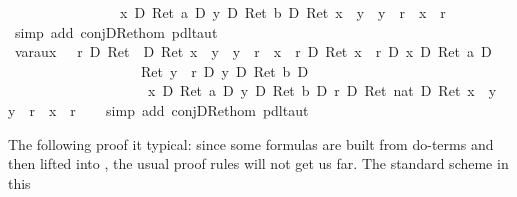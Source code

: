 \begin{isabellebody}
\ \ \ \ \ \ \ \ \ \ \ \ \ \ \ {\isacharparenleft}\ {\isacharasterisk}x\ {\isacharequal}\isactrlsub D\ Ret\ a\ {\isasymand}\isactrlsub D\ {\isacharasterisk}y\ {\isacharequal}\isactrlsub D\ Ret\ b\ {\isasymand}\isactrlsub D\ Ret\ {\isacharparenleft}x\ {\isasymnoteq}\ y\ {\isasymand}\ y\ {\isasymnoteq}\ r\ {\isasymand}\ x\ {\isasymnoteq}\ r{\isacharparenright}\ {\isacharparenright}{\isachardoublequote}\isanewline
\ \ \isamarkupfalse%
\ {\isacharparenleft}simp\ add{\isacharcolon}\ conjD{\isacharunderscore}Ret{\isacharunderscore}hom\ pdl{\isacharunderscore}taut{\isacharparenright}\isanewline
\isanewline
\isanewline
\isamarkupfalse%
\ var{\isacharunderscore}aux{}{\isacharcolon}\ {\isachardoublequote}{\isasymturnstile}\ {\isacharparenleft}{\isacharparenleft}\ {\isacharasterisk}r\ {\isacharequal}\isactrlsub D\ Ret\ {}\ {\isasymand}\isactrlsub D\ Ret\ {\isacharparenleft}x\ {\isasymnoteq}\ y\ {\isasymand}\ y\ {\isasymnoteq}\ r\ {\isasymand}\ x\ {\isasymnoteq}\ r{\isacharparenright}{\isacharparenright}\ {\isasymand}\isactrlsub D\ {\isacharparenleft}Ret\ {\isacharparenleft}x\ {\isasymnoteq}\ r{\isacharparenright}\ {\isasymlongrightarrow}\isactrlsub D\ {\isacharasterisk}x\ {\isacharequal}\isactrlsub D\ Ret\ a{\isacharparenright}{\isacharparenright}\ {\isasymand}\isactrlsub D\isanewline
\ \ \ \ \ \ \ \ \ \ \ \ \ \ \ \ \ \ \ {\isacharparenleft}Ret\ {\isacharparenleft}y\ {\isasymnoteq}\ r{\isacharparenright}\ {\isasymlongrightarrow}\isactrlsub D\ {\isacharasterisk}y\ {\isacharequal}\isactrlsub D\ Ret\ b{\isacharparenright}\ {\isasymlongrightarrow}\isactrlsub D\isanewline
\ \ \ \ \ \ \ \ \ \ \ \ \ \ \ \ \ \ \ {\isacharparenleft}\ {\isacharasterisk}x\ {\isacharequal}\isactrlsub D\ Ret\ a\ {\isasymand}\isactrlsub D\ {\isacharasterisk}y\ {\isacharequal}\isactrlsub D\ Ret\ b\ {\isasymand}\isactrlsub D\ {\isacharasterisk}r\ {\isacharequal}\isactrlsub D\ Ret\ {\isacharparenleft}{}{\isacharcolon}{\isacharcolon}nat{\isacharparenright}\ {\isasymand}\isactrlsub D\ Ret\ {\isacharparenleft}x\ {\isasymnoteq}\ y\ {\isasymand}\ y\ {\isasymnoteq}\ r\ {\isasymand}\ x\ {\isasymnoteq}\ r{\isacharparenright}{\isacharparenright}{\isachardoublequote}\isanewline
\ \ \isamarkupfalse%
\ {\isacharparenleft}simp\ add{\isacharcolon}\ conjD{\isacharunderscore}Ret{\isacharunderscore}hom\ pdl{\isacharunderscore}taut{\isacharparenright}\isamarkupfalse%
%
\begin{isamarkuptext}%
The following proof it typical: since some formulas are built from do-terms and then lifted
  into , the usual proof rules will not get us far. The standard scheme in this 

\end{isamarkuptext}
\end{isabellebody}
